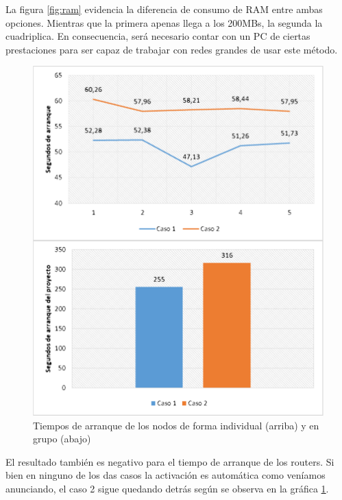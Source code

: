 La figura \ref{fig:ram} evidencia la diferencia de consumo de RAM entre ambas opciones. Mientras que la primera apenas llega a los 200MBs, la segunda la cuadriplica. En consecuencia, será necesario contar con un PC de ciertas prestaciones para ser capaz de trabajar con redes grandes de usar este método.

\begin{figure}[H]
  \centering
  \includegraphics[scale=0.4]{imagenes/tiemposarranque}
  \caption{Tiempos de arranque de los nodos de forma individual (arriba) y en grupo (abajo)}
  \label{fig:tiemposarranque}
\end{figure}

El resultado también es negativo para el tiempo de arranque de los routers. Si bien en ninguno de los das casos la activación es automática como veníamos anunciando, el caso 2 sigue quedando detrás según se observa en la gráfica \ref{fig:tiemposarranque}.

